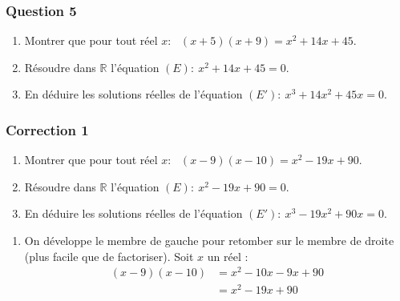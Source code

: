 \documentclass[15pt, mathserif]{beamer}
\newcommand{\R}{\mathbb{R}}			%
\begin{document}
\begin{frame} 
	\frametitle{Question 5}
\begin{enumerate} 
 	 	 \item Montrer que pour tout réel $x$:~ $(x+5)(x+9)=x^2+14x+45$. 
 	  \item Résoudre dans $\R$ l'équation $(E):~x^2+14x+45= 0$.  
 	 \item En déduire les solutions réelles de l'équation $(E'):~x^3+14x^2+45x = 0$. 
 \end{enumerate}\end{frame}


\begin{frame}
\vspace{-10mm}
	\frametitle{Correction 1}
\begin{enumerate} 
 	 \item Montrer que pour tout réel $x$:~ $(x-9)(x-10)=x^2-19x+90$. 
 	 \item Résoudre dans $\R$ l'équation $(E):~x^2-19x+90= 0$. 
 	 \item En déduire les solutions réelles de l'équation $(E'):~x^3-19x^2+90x = 0$. 
 \end{enumerate} 
 
 \bigskip 
 \bigskip 
 \begin{enumerate} 
 	 \item On développe le membre de gauche pour retomber sur le membre de droite (plus facile que de factoriser). Soit $x$ un réel : 
 	 	 \begin{align*} 
 	 	 (x-9)(x-10)&=x^2-10x-9x+90 \\ 
 	 	 	 &=x^2-19x+90 
 	 \end{align*} 
 \end{enumerate} 
 \end{frame} 
\end{document}
